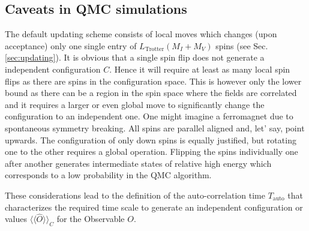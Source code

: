 
\subsection{Caveats in QMC simulations}\label{sec:caveats}
%
The default updating scheme consists of local moves which changes (upon acceptance) only one single entry of $L_{\mathrm{Trotter}}(M_I+M_V)$ spins (see Sec. \ref{sec:updating}). It is obvious that a single spin flip does not generate a independent configuration $C$. Hence it will require at least as many local spin flips as there are spins in the configuration space. This is however only the lower bound as there can be a region in the spin space where the fields are correlated and it requires a larger or even global move to significantly change the configuration to an independent one. One might imagine a ferromagnet due to spontaneous symmetry breaking. All spins are parallel aligned and, let' say, point upwards. The configuration of only down spins is equally justified, but rotating one to the other requires a global operation. Flipping the spins individually one after another generates intermediate states of relative high energy which corresponds to a low probability in the QMC algorithm.

These considerations lead to the definition of the auto-correlation time $T_\mathrm{auto}$ that characterizes the required time scale to generate an independent configuration or values $\langle\langle\hat{O}\rangle\rangle_C$ for the Observable $O$.

